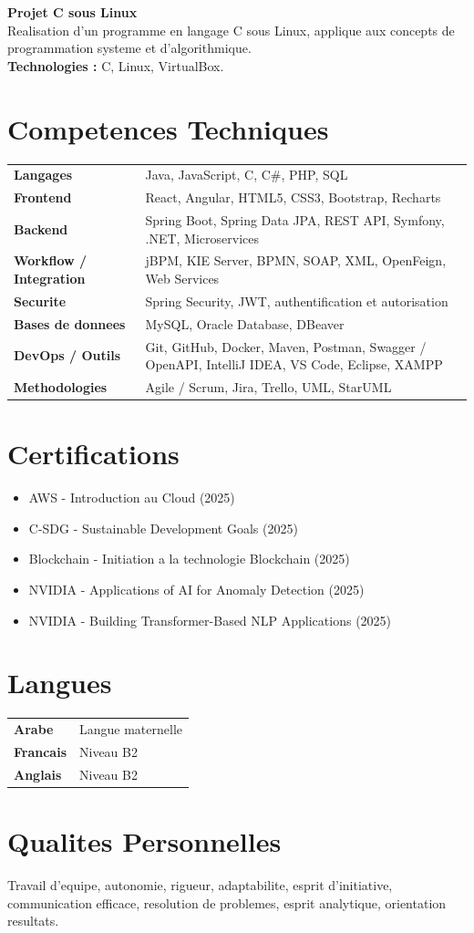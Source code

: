 \documentclass[10pt,a4paper]{article}
\begin{document}
\vspace{4pt}
\textbf{Projet C sous Linux}\\
Realisation d'un programme en langage C sous Linux, applique aux concepts de programmation systeme et d'algorithmique.\\
\textbf{Technologies :} C, Linux, VirtualBox.

\section*{Competences Techniques}
\begin{tabularx}{\textwidth}{@{} l X @{}}
\textbf{Langages} & Java, JavaScript, C, C\#, PHP, SQL \\
\textbf{Frontend} & React, Angular, HTML5, CSS3, Bootstrap, Recharts \\
\textbf{Backend} & Spring Boot, Spring Data JPA, REST API, Symfony, .NET, Microservices \\
\textbf{Workflow / Integration} & jBPM, KIE Server, BPMN, SOAP, XML, OpenFeign, Web Services \\
\textbf{Securite} & Spring Security, JWT, authentification et autorisation \\
\textbf{Bases de donnees} & MySQL, Oracle Database, DBeaver \\
\textbf{DevOps / Outils} & Git, GitHub, Docker, Maven, Postman, Swagger / OpenAPI, IntelliJ IDEA, VS Code, Eclipse, XAMPP \\
\textbf{Methodologies} & Agile / Scrum, Jira, Trello, UML, StarUML \\
\end{tabularx}

\section*{Certifications}
\begin{itemize}
    \item AWS - Introduction au Cloud (2025)
    \item C-SDG - Sustainable Development Goals (2025)
    \item Blockchain - Initiation a la technologie Blockchain (2025)
    \item NVIDIA - Applications of AI for Anomaly Detection (2025)
    \item NVIDIA - Building Transformer-Based NLP Applications (2025)
\end{itemize}

\section*{Langues}
\begin{tabularx}{\textwidth}{@{} l X @{}}
\textbf{Arabe} & Langue maternelle \\
\textbf{Francais} & Niveau B2 \\
\textbf{Anglais} & Niveau B2 \\
\end{tabularx}

\section*{Qualites Personnelles}
Travail d'equipe, autonomie, rigueur, adaptabilite, esprit d'initiative, communication efficace, resolution de problemes, esprit analytique, orientation resultats.
\end{document}

